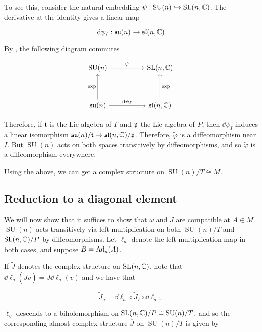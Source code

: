 \documentclass{report}
\DeclareMathOperator{\SU}{SU}
\newcommand{\su}{\mathfrak{su}}
\renewcommand{\sl}{\mathfrak{sl}}
\renewcommand{\tilde}{\widetilde}
\begin{document}
To see this, consider the natural embedding \(\psi : \SU(n) \hookrightarrow \SL(n, \C)\). The derivative at the identity gives a linear map

\[\dd\psi_I : \su(n) \to \sl(n, \C)\]

By \cite[Theorem 3.32]{warner}, the following diagram commutes

\[\begin{tikzcd}[ampersand replacement=\&]
	{\SU(n)} \&\& {\SL(n,\C)} \\
	\\
	{\su(n)} \&\& {\sl(n, \C)}
	\arrow["{\dd\psi_I}", from=3-1, to=3-3]
	\arrow["\psi", from=1-1, to=1-3]
	\arrow["\exp", from=3-1, to=1-1]
	\arrow["\exp"', from=3-3, to=1-3]
\end{tikzcd}\]

Therefore, if \(\mathfrak{t}\) is the Lie algebra of \(T\) and \(\mathfrak{p}\) the Lie algebra of \(P\), then \(\dd\psi_I\) induces a linear isomorphism \(\su(n)/\mft \to \sl(n, \C)/\mfp\). Therefore, \(\tilde\varphi\) is a diffeomorphism near \(I\). But \(\SU(n)\) acts on both spaces transitively by diffeomorphisms, and so \(\tilde\varphi\) is a diffeomorphism everywhere.

Using the above, we can get a complex structure on \(\SU(n)/T \cong M\).

\subsection{Reduction to a diagonal element}

We will now show that it suffices to show that \(\omega\) and \(J\) are compatible at \(A \in M\). \(\SU(n)\) acts transitively via left multiplication on both \(\SU(n)/T\) and \(\operatorname{SL}(n, \mathbb{C})/P\) by diffeomorphisms. Let \(\ell_a\) denote the left multiplication map in both cases, and suppose \(B = \operatorname{Ad}_a(A)\).

If \(\tilde J\) denotes the complex structure on \(\operatorname{SL}(n, \mathbb{C})\), note that \(\dd \ell_a(\tilde Jv) = \tilde J\dd\ell_a(v)\) and we have that

\[\tilde J_a = \dd \ell_a \circ \tilde J_I \circ \dd\ell_{a^{-1}}\]

\(\ell_g\) descends to a biholomorphism on \(\SL(n, \C)/P \cong \SU(n)/T\), and so the corresponding almost complex structure \(\overline J\) on \(\SU(n)/T\) is given by
\end{document}
